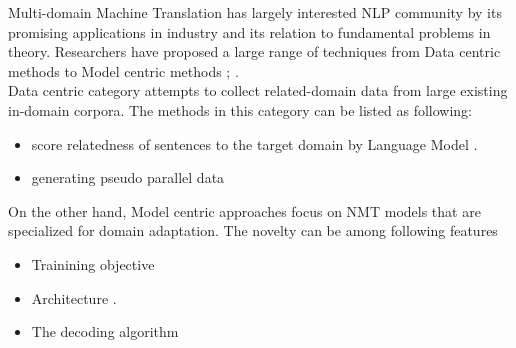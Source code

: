 \documentclass[11pt,a4paper]{article}
\newcommand{\fyTodo}[1]{\Todo[FY:]{\textcolor{orange}{#1}}}
\begin{document}
Multi-domain Machine Translation has largely interested NLP community by its promising applications in industry and its relation to fundamental problems in theory. Researchers have proposed a large range of techniques from Data centric methods to Model centric methods \cite{Chu18asurvey}; \cite{P17-2061}.\\ Data centric category attempts to collect related-domain data from large existing in-domain corpora. The methods in this category can be listed as following:
\fyTodo{Organize refs}
\begin{itemize}
	\item score relatedness of sentences to the target domain by Language Model \cite{P10-2041,D11-1033,P13-2119}.
	\item generating pseudo parallel data \cite{P03-1010,C16-1295,D14-1023}
\end{itemize}
On the other hand, Model centric approaches focus on NMT models that are specialized for domain adaptation. The novelty can be among following features
\begin{itemize}
	\item Trainining objective \cite{Luong2015SNMT,Senrich2016Mono,Wang2017Instance,Chen2017Cost,Miceli2017Regularize,Zhang18sentence}
	\item Architecture \cite{gulcehre2016monolingual,Zhang16topicinformed,Kobus17domaincontrol,Britz2017mixing,Biao2017CARENMT,Britz2017mixing,Thompson18freezing,Michel2018extreme}.
	\item The decoding algorithm \cite{gulcehre2016monolingual,Khayrallah2017lattice}
\end{itemize} 
\end{document}
